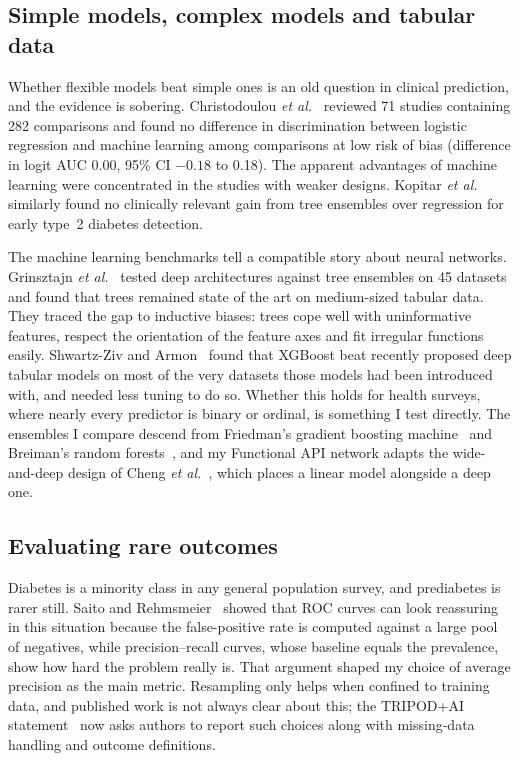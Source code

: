 \subsection{Simple models, complex models and tabular data}
Whether flexible models beat simple ones is an old question in clinical prediction, and the evidence is sobering. Christodoulou \emph{et al.}~\cite{christodoulou2019} reviewed 71 studies containing 282 comparisons and found no difference in discrimination between logistic regression and machine learning among comparisons at low risk of bias (difference in logit AUC 0.00, 95\% CI $-0.18$ to 0.18). The apparent advantages of machine learning were concentrated in the studies with weaker designs. Kopitar \emph{et al.}~\cite{kopitar2020} similarly found no clinically relevant gain from tree ensembles over regression for early type~2 diabetes detection.

The machine learning benchmarks tell a compatible story about neural networks. Grinsztajn \emph{et al.}~\cite{grinsztajn2022} tested deep architectures against tree ensembles on 45 datasets and found that trees remained state of the art on medium-sized tabular data. They traced the gap to inductive biases: trees cope well with uninformative features, respect the orientation of the feature axes and fit irregular functions easily. Shwartz-Ziv and Armon~\cite{shwartzziv2022} found that XGBoost beat recently proposed deep tabular models on most of the very datasets those models had been introduced with, and needed less tuning to do so. Whether this holds for health surveys, where nearly every predictor is binary or ordinal, is something I test directly. The ensembles I compare descend from Friedman's gradient boosting machine~\cite{friedman2001} and Breiman's random forests~\cite{breiman2001}, and my Functional API network adapts the wide-and-deep design of Cheng \emph{et al.}~\cite{cheng2016}, which places a linear model alongside a deep one.

\subsection{Evaluating rare outcomes}
Diabetes is a minority class in any general population survey, and prediabetes is rarer still. Saito and Rehmsmeier~\cite{saito2015} showed that ROC curves can look reassuring in this situation because the false-positive rate is computed against a large pool of negatives, while precision--recall curves, whose baseline equals the prevalence, show how hard the problem really is. That argument shaped my choice of average precision as the main metric. Resampling only helps when confined to training data, and published work is not always clear about this; the TRIPOD+AI statement~\cite{collins2024} now asks authors to report such choices along with missing-data handling and outcome definitions.

